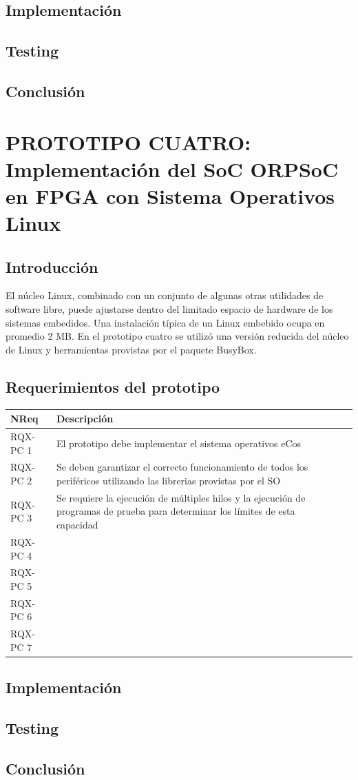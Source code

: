 		\subsection{Implementación}
		
		\subsection{Testing}
		
		\subsection{Conclusión}
		
		
	\section{PROTOTIPO CUATRO: Implementación del SoC ORPSoC en FPGA con Sistema Operativos Linux}
		\subsection{Introducción}
		El núcleo Linux, combinado con un conjunto de algunas otras utilidades de software libre, puede ajustarse dentro del limitado espacio de hardware 
	    de los sistemas embedidos. Una instalación típica de un Linux embebido ocupa en promedio 2 MB. En el prototipo cuatro se utilizó una versión
	    reducida del núcleo de Linux y herramientas provistas por el paquete BusyBox. 
		
		\subsection{Requerimientos del prototipo}
		
		\begin{table}[h]
		\centering	
		\begin{tabular}{ p{2.5cm} p{8cm} p{3cm} }
		\hline 
		\rowcolor[gray]{0.8} N\textordmasculine Req & Descripción\\
		\hline 
		RQX-PC 1 & El prototipo debe implementar el sistema operativos eCos\\ 
		\hline 
		RQX-PC 2 & Se deben garantizar el correcto funcionamiento de todos los periféricos utilizando las librerias provistas por el SO\\ 
		\hline 
		RQX-PC 3 & Se requiere la ejecución de múltiples hilos y la ejecución de programas de prueba para determinar los límites de esta capacidad \\ 
		\hline
		RQX-PC 4 & \\
		\hline
		RQX-PC 5 & \\
		\hline
		RQX-PC 6 & \\
		\hline
		RQX-PC 7 & \\
		\hline		
		\end{tabular}
		\end{table}
		
		
		\subsection{Implementación}
		
		\subsection{Testing}
		
		\subsection{Conclusión}
